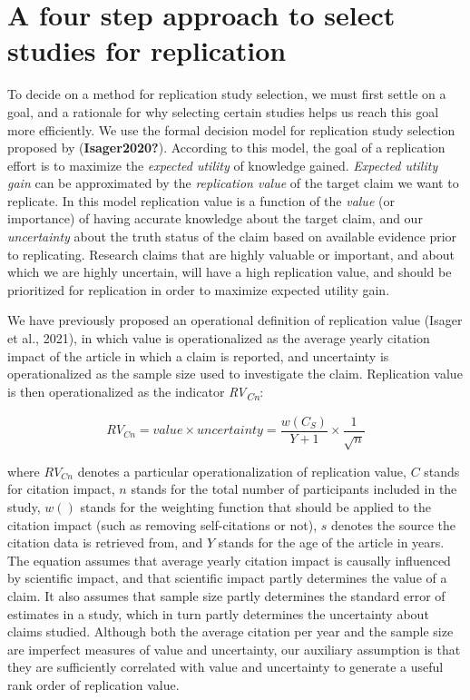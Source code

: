 \documentclass[
  man,floatsintext]{apa6}
\begin{document}
\hypertarget{a-four-step-approach-to-select-studies-for-replication}{%
\section{A four step approach to select studies for replication}\label{a-four-step-approach-to-select-studies-for-replication}}

To decide on a method for replication study selection, we must first settle on a goal, and a rationale for why selecting certain studies helps us reach this goal more efficiently. We use the formal decision model for replication study selection proposed by (\textbf{Isager2020?}). According to this model, the goal of a replication effort is to maximize the \emph{expected utility} of knowledge gained. \emph{Expected utility gain} can be approximated by the \emph{replication value} of the target claim we want to replicate. In this model replication value is a function of the \emph{value} (or importance) of having accurate knowledge about the target claim, and our \emph{uncertainty} about the truth status of the claim based on available evidence prior to replicating. Research claims that are highly valuable or important, and about which we are highly uncertain, will have a high replication value, and should be prioritized for replication in order to maximize expected utility gain.

We have previously proposed an operational definition of replication value (Isager et al., 2021), in which value is operationalized as the average yearly citation impact of the article in which a claim is reported, and uncertainty is operationalized as the sample size used to investigate the claim. Replication value is then operationalized as the indicator \emph{RV\textsubscript{Cn}}:

\begin{equation} 
  \tag{1}
  RV_{Cn} = value\times uncertainty = \frac{w(C_{S})}{Y+1}\times\frac{1}{\sqrt{n}}
  \label{eq:1}
\end{equation}

where \(RV_{Cn}\) denotes a particular operationalization of replication value, \(C\) stands for citation impact, \(n\) stands for the total number of participants included in the study, \(w()\) stands for the weighting function that should be applied to the citation impact (such as removing self-citations or not), \(s\) denotes the source the citation data is retrieved from, and \(Y\) stands for the age of the article in years. The equation assumes that average yearly citation impact is causally influenced by scientific impact, and that scientific impact partly determines the value of a claim. It also assumes that sample size partly determines the standard error of estimates in a study, which in turn partly determines the uncertainty about claims studied. Although both the average citation per year and the sample size are imperfect measures of value and uncertainty, our auxiliary assumption is that they are sufficiently correlated with value and uncertainty to generate a useful rank order of replication value.
\end{document}
